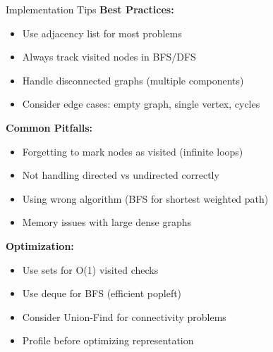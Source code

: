 \documentclass[aspectratio=169]{beamer}
\begin{document}
\begin{frame}{Implementation Tips}
  \textbf{Best Practices:}
  \begin{itemize}
    \item Use adjacency list for most problems
    \item Always track visited nodes in BFS/DFS
    \item Handle disconnected graphs (multiple components)
    \item Consider edge cases: empty graph, single vertex, cycles
  \end{itemize}

  \vspace{0.3cm}
  \textbf{Common Pitfalls:}
  \begin{itemize}
    \item Forgetting to mark nodes as visited (infinite loops)
    \item Not handling directed vs undirected correctly
    \item Using wrong algorithm (BFS for shortest weighted path)
    \item Memory issues with large dense graphs
  \end{itemize}

  \vspace{0.3cm}
  \textbf{Optimization:}
  \begin{itemize}
    \item Use sets for O(1) visited checks
    \item Use deque for BFS (efficient popleft)
    \item Consider Union-Find for connectivity problems
    \item Profile before optimizing representation
  \end{itemize}
\end{frame}
\end{document}

